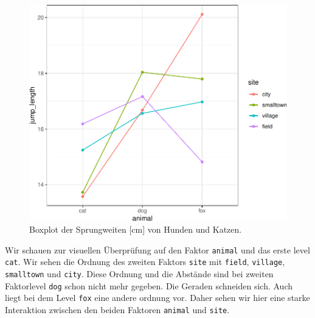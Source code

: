 \documentclass[
  letterpaper,
]{scrbook}
\begin{document}
\begin{figure}[H]

{\centering \includegraphics{./stat-tests-anova_files/figure-pdf/fig-interact-anova-1-1.pdf}

}

\caption{\label{fig-interact-anova-1}Boxplot der Sprungweiten {[}cm{]}
von Hunden und Katzen.}

\end{figure}

{}

Wir schauen zur visuellen Überprüfung auf den Faktor \texttt{animal} und
das erste level \texttt{cat}. Wir sehen die Ordnung des zweiten Faktors
\texttt{site} mit \texttt{field}, \texttt{village}, \texttt{smalltown}
und \texttt{city}. Diese Ordnung und die Abstände sind bei zweiten
Faktorlevel \texttt{dog} schon nicht mehr gegeben. Die Geraden schneiden
sich. Auch liegt bei dem Level \texttt{fox} eine andere ordnung vor.
Daher sehen wir hier eine starke Interaktion zwischen den beiden
Faktoren \texttt{animal} und \texttt{site}.

{}
\end{document}
